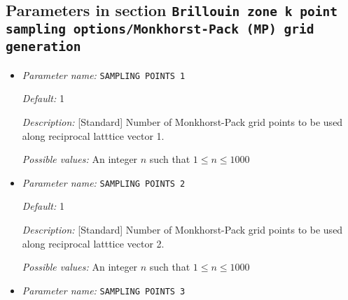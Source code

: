 \subsection{Parameters in section \tt Brillouin zone k point sampling options/Monkhorst-Pack (MP) grid generation}
\label{parameters:Brillouin_20zone_20k_20point_20sampling_20options/Monkhorst_2dPack_20_28MP_29_20grid_20generation}

\begin{itemize}
\item {\it Parameter name:} {\tt SAMPLING POINTS 1}
\label{parameters:Brillouin zone k point sampling options/Monkhorst_2dPack _28MP_29 grid generation/SAMPLING POINTS 1}
\label{parameters:Brillouin_20zone_20k_20point_20sampling_20options/Monkhorst_2dPack_20_28MP_29_20grid_20generation/SAMPLING_20POINTS_201}




{\it Default:} 1


{\it Description:} [Standard] Number of Monkhorst-Pack grid points to be used along reciprocal latttice vector 1.


{\it Possible values:} An integer $n$ such that $1\leq n \leq 1000$
\item {\it Parameter name:} {\tt SAMPLING POINTS 2}
\label{parameters:Brillouin zone k point sampling options/Monkhorst_2dPack _28MP_29 grid generation/SAMPLING POINTS 2}
\label{parameters:Brillouin_20zone_20k_20point_20sampling_20options/Monkhorst_2dPack_20_28MP_29_20grid_20generation/SAMPLING_20POINTS_202}




{\it Default:} 1


{\it Description:} [Standard] Number of Monkhorst-Pack grid points to be used along reciprocal latttice vector 2.


{\it Possible values:} An integer $n$ such that $1\leq n \leq 1000$
\item {\it Parameter name:} {\tt SAMPLING POINTS 3}
\label{parameters:Brillouin zone k point sampling options/Monkhorst_2dPack _28MP_29 grid generation/SAMPLING POINTS 3}
\label{parameters:Brillouin_20zone_20k_20point_20sampling_20options/Monkhorst_2dPack_20_28MP_29_20grid_20generation/SAMPLING_20POINTS_203}



\end{itemize}
